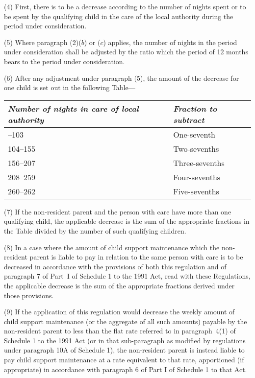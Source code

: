 \documentclass[12pt,a4paper]{article}
\begin{document}
(4) First, there is to be a decrease according to the number of nights spent or to be spent by the qualifying child in the care of the local authority during the period under consideration.

(5) Where paragraph (2)($b$)  or ($c$)  applies, the number of nights in the period under consideration shall be adjusted by the ratio which the period of 12 months bears to the period under consideration.

(6) After any adjustment under paragraph (5), the amount of the decrease for one child is set out in the following Table—

\noindent
\begin{longtable}{ll}
\hline
\itshape Number of nights in care of local authority	&\itshape Fraction to subtract\\
\hline
\endhead
\hline
\endlastfoot
52--103	&One-seventh\\
104--155	&Two-sevenths\\
156--207	&Three-sevenths\\
208--259	&Four-sevenths\\
260--262	&Five-sevenths\\
\end{longtable}

(7) If the non-resident parent and the person with care have more than one qualifying child, the applicable decrease is the sum of the appropriate fractions in the Table divided by the number of such qualifying children.

(8) In a case where the amount of child support maintenance which the non-resident parent is liable to pay in relation to the same person with care is to be decreased in accordance with the provisions of both this regulation and of paragraph 7 of Part~I of Schedule 1 to the 1991 Act, read with these Regulations, the applicable decrease is the sum of the appropriate fractions derived under those provisions.

\begin{sloppypar}
(9) If the application of this regulation would decrease the weekly amount of child support maintenance (or the aggregate of all such amounts) payable by the non-resident parent to less than the flat rate referred to in paragraph~4(1) of Schedule 1 to the 1991 Act (or in that sub-paragraph as modified by regulations under paragraph 10A of Schedule 1), the non-resident parent is instead liable to pay child support maintenance at a rate equivalent to that rate, apportioned (if appropriate) in accordance with paragraph 6 of Part I of Schedule 1 to that Act.
\end{sloppypar}
\end{document}
